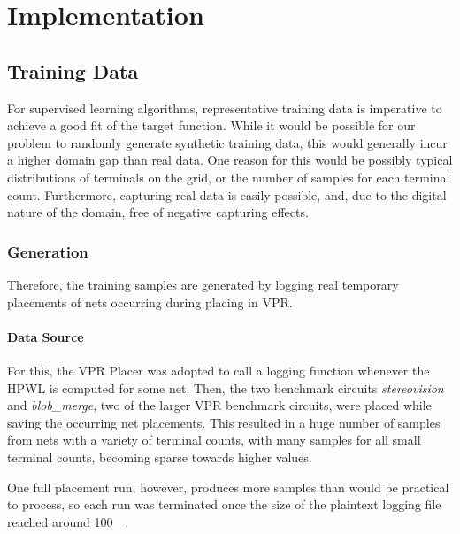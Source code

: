 
\chapter{Implementation}\label{ch:implementation}
\glsresetall %

\section{Training Data}

For supervised learning algorithms, representative training data is imperative to achieve a good fit of the target function. While it would be possible for our problem to randomly generate synthetic training data, this would generally incur a higher domain gap than real data. One reason for this would be possibly typical distributions of terminals on the grid, or the number of samples for each terminal count. Furthermore, capturing real data is easily possible, and, due to the digital nature of the domain, free of negative capturing effects.

\subsection{Generation}

Therefore, the training samples are generated by logging real temporary placements of nets occurring during placing in \gls{VPR}.

\subsubsection{Data Source}

For this, the \gls{VPR} Placer was adopted to call a logging function whenever the \gls{HPWL} is computed for some net. Then, the two benchmark circuits \textit{stereovision} and \textit{blob\_merge}, two of the larger \gls{VPR} benchmark circuits, were placed while saving the occurring net placements. This resulted in a huge number of samples from nets with a variety of terminal counts, with many samples for all small terminal counts, becoming sparse towards higher values.

One full placement run, however, produces more samples than would be practical to process, so each run was terminated once the size of the plaintext logging file reached around \SI{100}{\mega\byte}.

